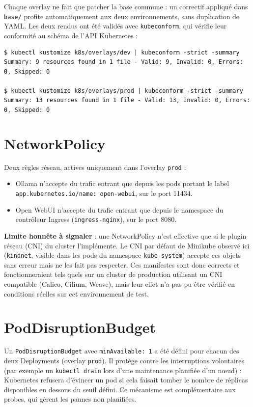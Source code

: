 ﻿\documentclass[11pt,a4paper]{article}
\begin{document}
Chaque overlay ne fait que patcher la base commune : un correctif appliqué dans \texttt{base/} profite automatiquement aux deux environnements, sans duplication de YAML. Les deux rendus ont été validés avec \texttt{kubeconform}, qui vérifie leur conformité au schéma de l'API Kubernetes :

\begin{lstlisting}
$ kubectl kustomize k8s/overlays/dev | kubeconform -strict -summary
Summary: 9 resources found in 1 file - Valid: 9, Invalid: 0, Errors: 0, Skipped: 0

$ kubectl kustomize k8s/overlays/prod | kubeconform -strict -summary
Summary: 13 resources found in 1 file - Valid: 13, Invalid: 0, Errors: 0, Skipped: 0
\end{lstlisting}

\section{NetworkPolicy}

Deux règles réseau, actives uniquement dans l'overlay \texttt{prod} :

\begin{itemize}[nosep]
    \item Ollama n'accepte du trafic entrant que depuis les pods portant le label \texttt{app.kubernetes.io/name: open-webui}, sur le port 11434.
    \item Open WebUI n'accepte du trafic entrant que depuis le namespace du contrôleur Ingress (\texttt{ingress-nginx}), sur le port 8080.
\end{itemize}

\textbf{Limite honnête à signaler} : une NetworkPolicy n'est effective que si le plugin réseau (CNI) du cluster l'implémente. Le CNI par défaut de Minikube observé ici (\texttt{kindnet}, visible dans les pods du namespace \texttt{kube-system}) accepte ces objets sans erreur mais ne les fait pas respecter. Ces manifestes sont donc corrects et fonctionneraient tels quels sur un cluster de production utilisant un CNI compatible (Calico, Cilium, Weave), mais leur effet n'a pas pu être vérifié en conditions réelles sur cet environnement de test.

\section{PodDisruptionBudget}

Un \texttt{PodDisruptionBudget} avec \texttt{minAvailable: 1} a été défini pour chacun des deux Deployments (overlay \texttt{prod}). Il protège contre les interruptions volontaires (par exemple un \texttt{kubectl drain} lors d'une maintenance planifiée d'un nœud) : Kubernetes refusera d'évincer un pod si cela faisait tomber le nombre de réplicas disponibles en dessous du seuil défini. Ce mécanisme est complémentaire aux probes, qui gèrent les pannes non planifiées.
\end{document}
